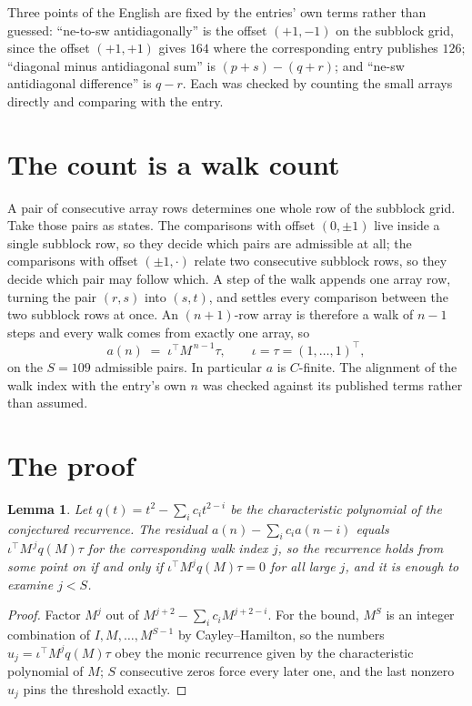 \documentclass[11pt,a4paper]{article}
\theoremstyle{plain}
\newtheorem{lemma}[theorem]{Lemma}
\theoremstyle{definition}
\begin{document}
Three points of the English are fixed by the entries' own terms rather than guessed:
``ne-to-sw antidiagonally'' is the offset $(+1,-1)$ on the subblock grid, since the offset
$(+1,+1)$ gives $164$ where the corresponding entry publishes $126$; ``diagonal minus
antidiagonal sum'' is $(p+s)-(q+r)$; and ``ne-sw antidiagonal difference'' is $q-r$. Each was
checked by counting the small arrays directly and comparing with the entry.

\section{The count is a walk count}

A pair of consecutive array rows determines one whole row of the subblock grid. Take those
pairs as states. The comparisons with offset $(0,\pm1)$ live inside a single subblock row, so
they decide which pairs are admissible at all; the comparisons with offset $(\pm1,\cdot)$
relate two consecutive subblock rows, so they decide which pair may follow which. A step of the
walk appends one array row, turning the pair $(r,s)$ into $(s,t)$, and settles every comparison
between the two subblock rows at once. An $(n+1)$-row array is therefore a walk of $n-1$ steps
and every walk comes from exactly one array, so
\[
a(n)\;=\;\iota^{\!\top}M^{\,n-1}\tau,\qquad \iota=\tau=(1,\dots,1)^{\!\top},
\]
on the $S=109$ admissible pairs. In particular $a$ is $C$-finite. The alignment of the walk
index with the entry's own $n$ was checked against its published terms rather than assumed.

\section{The proof}

\begin{lemma}\label{lem:crit}
Let $q(t)=t^{2}-\sum_i c_it^{2-i}$ be the characteristic polynomial of the
conjectured recurrence. The residual $a(n)-\sum_ic_ia(n-i)$ equals
$\iota^{\!\top}M^{\,j}q(M)\tau$ for the corresponding walk index $j$, so the recurrence
holds from some point on if and only if $\iota^{\!\top}M^{j}q(M)\tau=0$ for all large $j$,
and it is enough to examine $j<S$.
\end{lemma}

\begin{proof}
Factor $M^{j}$ out of $M^{j+2}-\sum_ic_iM^{j+2-i}$. For the bound, $M^{S}$
is an integer combination of $I,M,\dots,M^{S-1}$ by Cayley--Hamilton, so the numbers
$u_j=\iota^{\!\top}M^{j}q(M)\tau$ obey the monic recurrence given by the characteristic
polynomial of $M$; $S$ consecutive zeros force every later one, and the last nonzero $u_j$
pins the threshold exactly.
\end{proof}
\end{document}
